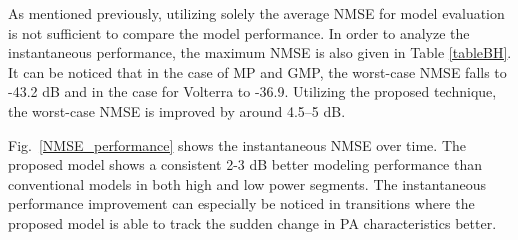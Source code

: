 \documentclass[journal]{IEEEtran}
\begin{document}
As mentioned previously, utilizing solely the average NMSE for model evaluation is not sufficient to compare the model performance. In order to analyze the instantaneous performance, the maximum NMSE is also given in Table \ref{tableBH}. It can be noticed that in the case of MP and GMP, the worst-case NMSE falls to -43.2 dB and in the case for Volterra to -36.9. Utilizing the proposed technique, the worst-case NMSE is improved by around 4.5--5 dB.
\begin{table}
\caption{Comparison of behavioral modeling performance for the proposed modeling technique and MP and GMP. Model orders are shown in the parenthesis and are chosen for relatively similar complexity.} 
\end{table}



Fig.~\ref{NMSE_performance} shows the instantaneous NMSE over time. The proposed model shows a consistent 2-3 dB better modeling performance than conventional models in both high and low power segments. The instantaneous performance improvement can especially be noticed in transitions where the proposed model is able to track the sudden change in PA characteristics better.
\end{document}
